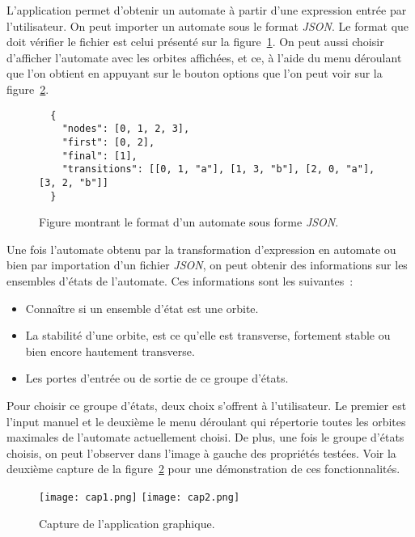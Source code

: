 L'application permet d'obtenir un automate à partir d'une expression entrée
par l'utilisateur. On peut importer un automate sous le format \textit{JSON}. Le
format que doit vérifier le fichier est celui présenté sur la
figure~\ref{fig:jsonFormat}. On peut aussi choisir d'afficher l'automate avec
les orbites affichées, et ce, à l'aide du menu déroulant que l'on obtient en
appuyant sur le bouton options que l'on peut voir sur la
figure~\ref{fig:cap1}.

\begin{figure}[H]
    \begin{verbatim}
  {
    "nodes": [0, 1, 2, 3],
    "first": [0, 2],
    "final": [1],
    "transitions": [[0, 1, "a"], [1, 3, "b"], [2, 0, "a"], [3, 2, "b"]] 
  }
  \end{verbatim}
    \caption{Figure montrant le format d'un automate sous forme \textit{JSON}.}
    \label{fig:jsonFormat}
\end{figure}

\newpage

Une fois l'automate obtenu par la transformation d'expression en automate ou
bien par importation d'un fichier \textit{JSON}, on peut obtenir des
informations sur les ensembles d'états de l'automate. Ces informations sont les
suivantes~:

\begin{itemize}
    \item[\textbullet] Connaître si un ensemble d'état est une orbite.
    \item[\textbullet] La stabilité d'une orbite, est ce qu'elle est transverse,
        fortement stable ou bien encore hautement transverse.
    \item[\textbullet] Les portes d'entrée ou de sortie de ce groupe d'états.
\end{itemize}

Pour choisir ce groupe d'états, deux choix s'offrent à l'utilisateur. Le premier
est l'input manuel et le deuxième le menu déroulant qui répertorie toutes les
orbites maximales de l'automate actuellement choisi. De plus, une fois le
groupe d'états choisis, on peut l'observer dans l'image à gauche des propriétés
testées. Voir la deuxième capture de la figure~\ref{fig:cap1} pour une
démonstration de ces fonctionnalités.

\begin{figure}[H]
    \texttt{[image: cap1.png]}
    \texttt{[image: cap2.png]}
    \caption{Capture de l'application graphique.}\label{fig:cap1}
\end{figure}

